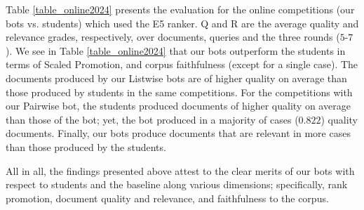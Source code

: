 Table \ref{table_online2024} presents the evaluation for the
online competitions (our bots vs. students) which used the E5 ranker.
Q and R are the average
quality and relevance grades, respectively, over documents, queries and the three
rounds ($5$-$7$). We see in Table \ref{table_online2024} that our bots
outperform the students in terms of Scaled Promotion, \normFaith and
corpus faithfulness (except for a single case). The documents produced by our Listwise bots are of higher
quality on average than those produced by students in the same
competitions. For the competitions with our Pairwise bot, the
students produced documents of higher quality on average than those of the bot; yet, the bot
 produced in a majority of cases ($0.822$) quality documents. Finally, our bots produce
documents that are relevant in more cases than those produced by the
students.

All in all, the findings presented above attest to the clear merits of our
bots with respect to students and the \sentReplace baseline along various dimensions; specifically, rank promotion, document quality and relevance, and faithfulness to the corpus.


